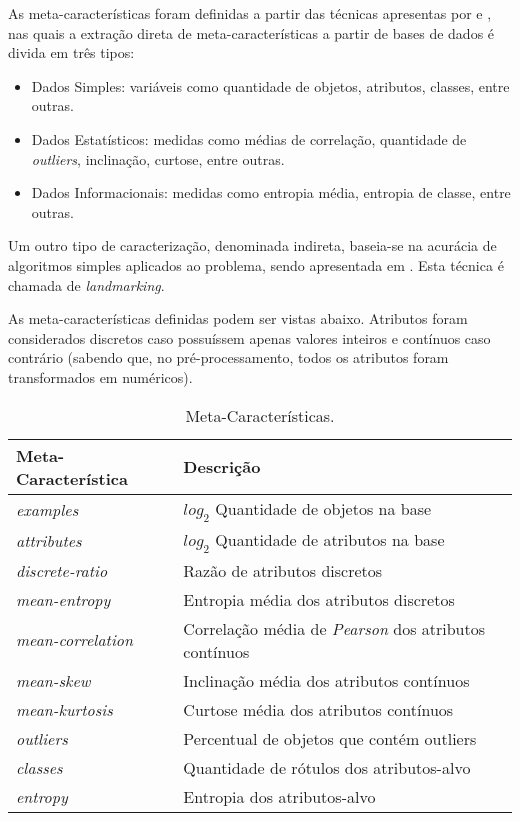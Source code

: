 \documentclass[runningheads]{llncs}
\begin{document}
As meta-características foram definidas a partir das técnicas apresentas por \cite{statlog} e \cite{survey}, nas quais a extração direta de meta-características a partir de bases de dados é divida em três tipos: 

\begin{itemize}
    \item Dados Simples: variáveis como quantidade de objetos, atributos, classes, entre outras.
    \item Dados Estatísticos: medidas como médias de correlação, quantidade de \emph{outliers}, inclinação, curtose, entre outras.
    \item Dados Informacionais: medidas como entropia média, entropia de classe, entre outras.
\end{itemize}

Um outro tipo de caracterização, denominada indireta, baseia-se na acurácia de algoritmos simples aplicados ao problema, sendo apresentada em \cite{landmarking}. Esta técnica é chamada de \emph{landmarking}.

As meta-características definidas podem ser vistas abaixo. Atributos foram considerados discretos caso possuíssem apenas valores inteiros e contínuos caso contrário (sabendo que, no pré-processamento, todos os atributos foram transformados em numéricos).

\begin{table}[ht]
\centering
\caption{Meta-Características.}\label{attributes}
\begin{tabular}{|l|l|}
\hline
Meta-Característica & Descrição \\
\hline
\emph{examples} & ${log_2}$ Quantidade de objetos na base \\
\emph{attributes} & ${log_2}$ Quantidade de atributos na base \\
\emph{discrete-ratio} & Razão de atributos discretos \\
\emph{mean-entropy} & Entropia média dos atributos discretos \\
\emph{mean-correlation} & Correlação média de \emph{Pearson} dos atributos contínuos \\
\emph{mean-skew} & Inclinação média dos atributos contínuos \\
\emph{mean-kurtosis} & Curtose média dos atributos contínuos \\
\emph{outliers} & Percentual de objetos que contém outliers \\
\emph{classes} & Quantidade de rótulos dos atributos-alvo \\
\emph{entropy} & Entropia dos atributos-alvo \\
\hline
\end{tabular}
\end{table}
\end{document}
